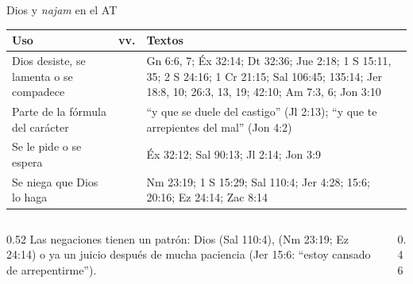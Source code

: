 \begin{frame}{Dios y \emph{najam} en el AT}
\scriptsize\renewcommand{\arraystretch}{1.16}
\begin{tabular}{@{}>{\RaggedRight\arraybackslash}p{2.6cm}>{\RaggedRight\arraybackslash}p{0.7cm}>{\RaggedRight\arraybackslash}p{8.5cm}@{}}
\toprule
\textbf{Uso} & \textbf{vv.} & \textbf{Textos} \\ \midrule
Dios desiste, se lamenta o se compadece & 20 & Gn 6:6, 7; Éx 32:14; Dt 32:36; Jue 2:18; 1 S 15:11, 35; 2 S 24:16; 1 Cr 21:15; Sal 106:45; 135:14; Jer 18:8, 10; 26:3, 13, 19; 42:10; Am 7:3, 6; Jon 3:10 \\
Parte de la fórmula del carácter & 2 & ``y que se duele del castigo'' (Jl 2:13); ``y que te arrepientes del mal'' (Jon 4:2) \\
Se le pide o se espera & 4 & Éx 32:12; Sal 90:13; Jl 2:14; Jon 3:9 \\
Se niega que Dios lo haga & 8 & Nm 23:19; 1 S 15:29; Sal 110:4; Jer 4:28; 15:6; 20:16; Ez 24:14; Zac 8:14 \\
\bottomrule
\end{tabular}\par\medskip
\begin{columns}[t,onlytextwidth]
\begin{column}{0.52\textwidth}\small
Las negaciones tienen un patrón: Dios  (Sal 110:4),  (Nm 23:19; Ez 24:14) o ya  un juicio después de mucha paciencia (Jer 15:6: ``estoy cansado de arrepentirme'').
\end{column}
\begin{column}{0.46\textwidth}
\end{column}
\end{columns}
\end{frame}

